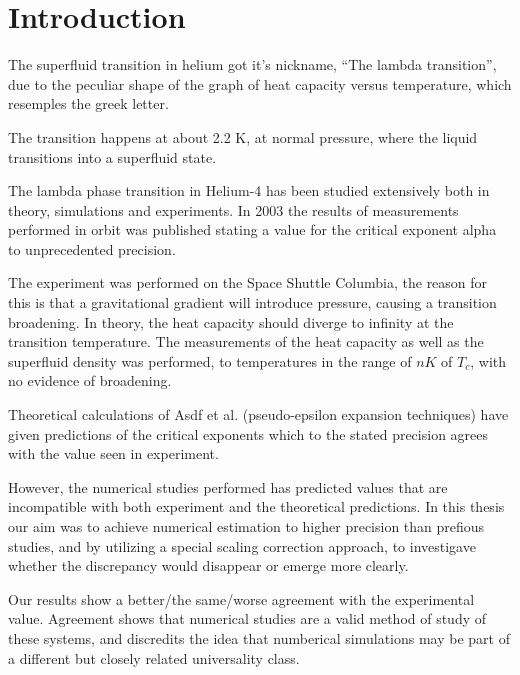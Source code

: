 %

\section{Introduction}
The superfluid transition in helium got it's nickname, ``The lambda transition'', due to the peculiar shape of the graph of heat capacity versus temperature, which resemples the greek letter. 

The transition happens at about 2.2 K, at normal pressure, where the liquid transitions into a superfluid state.

The lambda phase transition in Helium-4 has been studied extensively both in theory, simulations and experiments. In 2003 the results of measurements performed in orbit was published\cite{Lipa2003} stating a value for the critical exponent alpha to unprecedented precision.

The experiment was performed on the Space Shuttle Columbia, the reason for this is that a gravitational gradient will introduce pressure, causing a transition broadening. In theory, the heat capacity should diverge to infinity at the transition temperature.
The measurements of the heat capacity as well as the superfluid density was performed, to temperatures in the range of $nK$ of $T_c$, with no evidence of broadening.

Theoretical calculations of Asdf et al. (pseudo-epsilon expansion techniques\cite{Sokolov2016}) have given predictions of the critical exponents which to the stated precision agrees with the value seen in experiment.

However, the numerical studies performed has predicted values that are incompatible with both experiment and the theoretical predictions. \cite{Campostrini2006} 
In this thesis our aim was to achieve numerical estimation to higher precision than prefious studies, and by utilizing a special scaling correction approach, to investigave whether the discrepancy would disappear or emerge more clearly. 

Our results show a better/the same/worse agreement with the experimental value. Agreement shows that numerical studies are a valid method of study of these systems, and discredits the idea that numberical simulations may be part of a different but closely related universality class.


